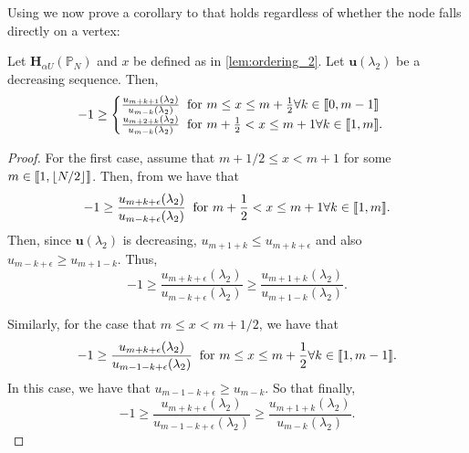     Using  we now prove a corollary to  that holds regardless of whether the node falls directly on a vertex:
       \begin{cor}\label{cor:ordering}
    	Let $\mathbf{H}_{\alpha U}(\mathbb{P}_N)$ and $x$ be defined as in \cref{lem:ordering_2}. Let $\mathbf{u}(\lambda_2)$ be a decreasing sequence. Then,
    	\begin{equation}
	-1 \geq \begin{cases}
 			\frac{u_{m+k+1}(\lambda_2)}{u_{m-k}(\lambda_2)} \; \; \text{for $m \leq x \leq m + \frac{1}{2} \forall k \in \left \llbracket 0 , m-1 \right \rrbracket$} \\
 			\frac{u_{m+2+k}(\lambda_2)}{u_{m-k}(\lambda_2)} \; \; \text{for $m + \frac{1}{2} < x \leq m + 1 \forall k \in \left \llbracket 1 , m \right \rrbracket$}.
 		\end{cases}
 	\end{equation}
    \end{cor}
    \begin{proof}
    	For the first case, assume that $m+1/2 \leq x < m+1$ for some $m\in \left \llbracket 1 , \lfloor N/2 \rfloor \right \rrbracket$. Then, from  we have that
    	\begin{equation}
    		-1 \geq \frac{u_{m+k+\epsilon}(\lambda_2)}{u_{m-k+\epsilon}(\lambda_2)} \; \; \text{for $m + \frac{1}{2} < x \leq m + 1 \forall k \in \left \llbracket 1 , m \right \rrbracket$}.
    	\end{equation}
	Then, since $\mathbf{u}(\lambda_2)$ is decreasing, $u_{m+1+k} \leq u_{m+k+\epsilon}$ and also $u_{m-k+\epsilon} \geq u_{m+1-k}$. Thus,
	\begin{equation}
		-1 \geq \frac{u_{m+k+\epsilon}(\lambda_2)}{u_{m-k+\epsilon}(\lambda_2)} \geq \frac{u_{m+1+k}(\lambda_2)}{u_{m+1-k}(\lambda_2)}.
	\end{equation}

	Similarly, for the case that $m \leq x < m+1/2$, we have that
	\begin{equation}
    		-1 \geq \frac{u_{m+k+\epsilon}(\lambda_2)}{u_{m-1-k+\epsilon}(\lambda_2)} \; \; \text{for $m \leq x \leq m + \frac{1}{2} \forall k \in \left \llbracket 1 , m-1 \right \rrbracket$}.
    	\end{equation}
	In this case, we have that $u_{m-1-k+\epsilon} \geq u_{m-k}$. So that finally,
	\begin{equation}
    		-1 \geq \frac{u_{m+k+\epsilon}(\lambda_2)}{u_{m-1-k+\epsilon}(\lambda_2)} \geq \frac{u_{m+1+k}(\lambda_2)}{u_{m-k}(\lambda_2)}.
    	\end{equation}
    \end{proof}


